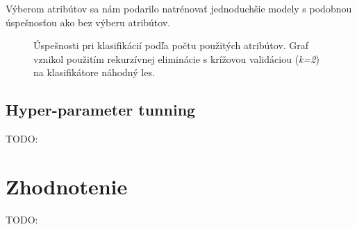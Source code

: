 \documentclass[runningheads]{llncs}
\begin{document}
Výberom atribútov sa nám podarilo natrénovať jednoduchšie modely s podobnou úspešnosťou ako bez výberu atribútov.

\begin{figure}%
    \centering
    \qquad
    \caption{Úspešnosti pri klasifikácií podľa počtu použitých atribútov. Graf vznikol použitím rekurzívnej eliminácie s krížovou validáciou (\textit{k=2}) na klasifikátore náhodný les.}%
    \label{fig:feature_selection_classification_position}%
\end{figure}

\subsection{Hyper-parameter tunning}

TODO:

\section{Zhodnotenie}

TODO:

\newpage



\end{document}
